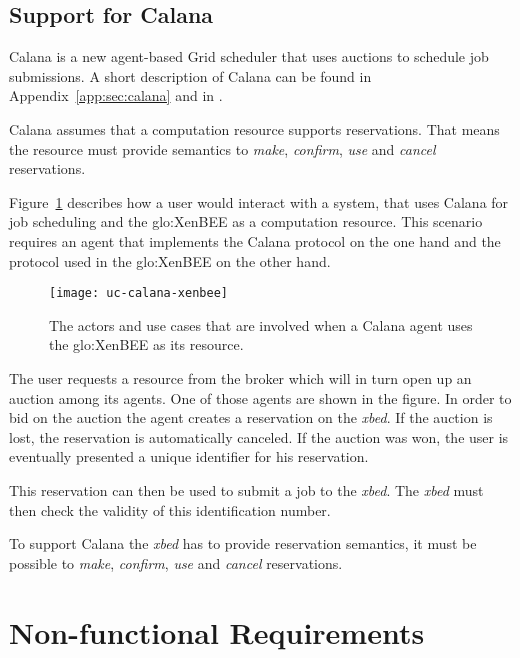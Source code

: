 \subsection{Support for Calana}
\label{sec:calana-support}

Calana is a new agent-based  Grid scheduler that uses auctions to schedule
job  submissions.   A  short  description   of  Calana  can  be  found  in
Appendix~\ref{app:sec:calana}    and    in    \cite{dalheimer05agentbased,
  petry06}.

Calana  assumes that  a computation  resource supports  reservations. That
means the resource must  provide semantics to \emph{make}, \emph{confirm},
\emph{use} and \emph{cancel} reservations.

Figure~\ref{fig:calana-xenbee} describes how a  user would interact with a
system, that uses Calana for  job scheduling and the \gls{glo:XenBEE} as a
computation resource. This scenario  requires an agent that implements the
Calana  protocol   on  the  one  hand   and  the  protocol   used  in  the
\gls{glo:XenBEE} on the other hand.

\begin{figure}[htbp]
  \centering
  \texttt{[image: uc-calana-xenbee]}
  \caption[Calana and  XenBEE]{The actors and use cases  that are involved
    when a Calana agent uses the \gls{glo:XenBEE} as its resource.}
  \label{fig:calana-xenbee}
\end{figure}

The user requests a resource from the broker which will in turn open up an
auction among  its agents.  One of  those agents are shown  in the figure.
In order  to bid  on the auction  the agent  creates a reservation  on the
\emph{xbed}.   If the auction  is lost,  the reservation  is automatically
canceled.   If the auction  was won,  the user  is eventually  presented a
unique identifier for his reservation.

This reservation can then be used to submit a job to the \emph{xbed}.  The
\emph{xbed} must then check the validity of this identification number.

To support  Calana the \emph{xbed}  has to provide  reservation semantics,
\ie  it must be  possible to  \emph{make}, \emph{confirm},  \emph{use} and
\emph{cancel} reservations.

\section{Non-functional Requirements}

